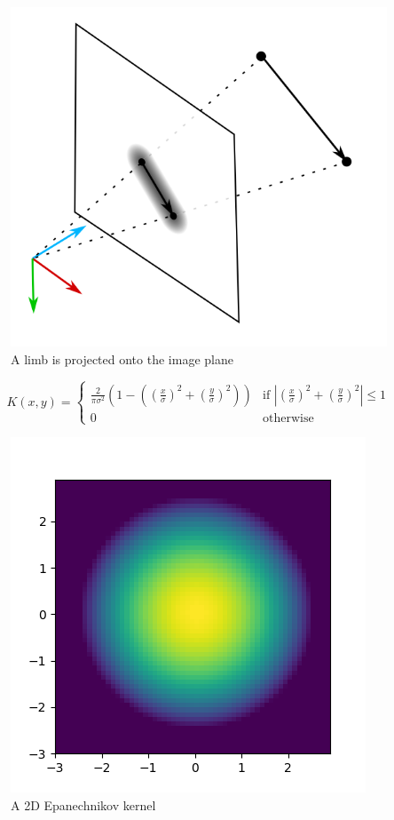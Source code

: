 \begin{figure}
  \centering
  \includegraphics[width=.6\textwidth]{img/projection}
  \caption[Projection]{A limb is projected onto the image plane}
  \label{fig:projection}
\end{figure}

\begin{equation}
  \label{eq:epanechnikov}
  K(x, y) =
  \begin{cases}
    \frac{2}{\pi\sigma^{2}}(1 - ((\frac{x}{\sigma})^{2} + (\frac{y}{\sigma})^{2})) & \text{if } |(\frac{x}{\sigma})^{2} + (\frac{y}{\sigma})^{2}| \leq 1\\
    0 & \text{otherwise}
  \end{cases}
\end{equation}

\begin{figure}
  \centering
  \includegraphics[width=.4\textwidth]{img/epanechnikov_2d}
  \caption{A 2D Epanechnikov \cite{epanechnikov_1969} kernel}
  \label{fig:epanechnikov}
\end{figure}

